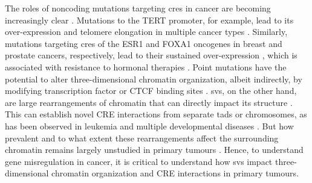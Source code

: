 The roles of noncoding mutations targeting \glspl{cre} in cancer are becoming increasingly clear \cite{zhouEmergenceNoncodingCancer2016,rheinbayAnalysesNoncodingSomatic2020,liPatternsSomaticStructural2020}.
Mutations to the TERT promoter, for example, lead to its over-expression and telomere elongation in multiple cancer types \cite{vinagreFrequencyTERTPromoter2013,huangHighlyRecurrentTERT2013,sternMutationTERTPromoter2015}.
Similarly, mutations targeting \glspl{cre} of the ESR1 and FOXA1 oncogenes in breast and prostate cancers, respectively, lead to their sustained over-expression \cite{baileyNoncodingSomaticInherited2016,zhouNoncodingMutationsTarget2020,paroliaDistinctStructuralClasses2019}, which is associated with resistance to hormonal therapies \cite{jeselsohnESR1MutationsMechanism2015,robinsonFoxA1KeyMediator2012,fuFOXA1OverexpressionMediates2016,fuFOXA1UpregulationPromotes2019}.
Point mutations have the potential to alter three-dimensional chromatin organization, albeit indirectly, by modifying transcription factor or CTCF binding sites \cite{mauranoLargescaleIdentificationSequence2015,guoMutationHotspotsCTCF2018}.
\glspl{sv}, on the other hand, are large rearrangements of chromatin that can directly impact its structure \cite{dixonIntegrativeDetectionAnalysis2018,akdemirDisruptionChromatinFolding2020}.
This can establish novel CRE interactions from separate \glspl{tad} or chromosomes, as has been observed in leukemia \cite{hniszActivationProtooncogenesDisruption2016} and multiple developmental diseases \cite{lupianezDisruptionsTopologicalChromatin2015,allouNoncodingDeletionsIdentify2021}.
But how prevalent and to what extent these rearrangements affect the surrounding chromatin remains largely unstudied in primary tumours \cite{akdemirDisruptionChromatinFolding2020,liPatternsSomaticStructural2020,iyyankiSubtypeassociatedEpigenomicLandscape2021}.
Hence, to understand gene misregulation in cancer, it is critical to understand how \glspl{sv} impact three-dimensional chromatin organization and CRE interactions in primary tumours.

